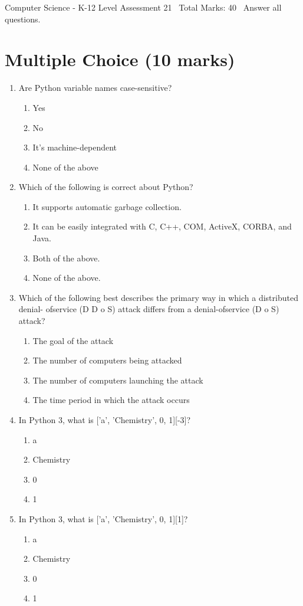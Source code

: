 \documentclass[12pt]{article}
\begin{document}
\begin{center}
Computer Science - K-12 Level Assessment 21 \
Total Marks: 40 \
Answer all questions.
\end{center}

\section*{Multiple Choice (10 marks)}
\begin{enumerate}[label=\arabic*.]
\item Are Python variable names case-sensitive?
\begin{enumerate}[label=(\alph*)]
    \item Yes
    \item No
    \item It's machine-dependent
    \item None of the above
\end{enumerate}
\item Which of the following is correct about Python?
\begin{enumerate}[label=(\alph*)]
    \item It supports automatic garbage collection.
    \item It can be easily integrated with C, C++, COM, ActiveX, CORBA, and Java.
    \item Both of the above.
    \item None of the above.
\end{enumerate}
\item Which of the following best describes the primary way in which a distributed denial- ofservice (D D o S) attack differs from a denial-ofservice (D o S) attack?
\begin{enumerate}[label=(\alph*)]
    \item The goal of the attack
    \item The number of computers being attacked
    \item The number of computers launching the attack
    \item The time period in which the attack occurs
\end{enumerate}
\item In Python 3, what is ['a', 'Chemistry', 0, 1][-3]?
\begin{enumerate}[label=(\alph*)]
    \item a
    \item Chemistry
    \item 0
    \item 1
\end{enumerate}
\item In Python 3, what is ['a', 'Chemistry', 0, 1][1]?
\begin{enumerate}[label=(\alph*)]
    \item a
    \item Chemistry
    \item 0
    \item 1
\end{enumerate}
\end{enumerate}
\end{document}
